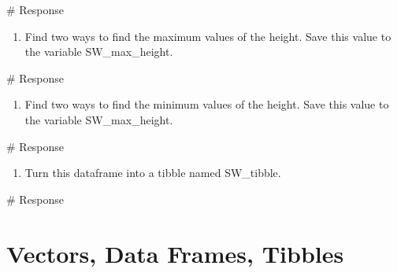 \documentclass[
  letterpaper,
  DIV=11,
  numbers=noendperiod]{scrreprt}
\newenvironment{Shaded}{\begin{snugshade}}{\end{snugshade}}
\newcommand{\CommentTok}[1]{\textcolor[rgb]{0.37,0.37,0.37}{#1}}
\providecommand{\tightlist}{%
  \setlength{\itemsep}{0pt}\setlength{\parskip}{0pt}}\usepackage{longtable,booktabs,array}
\begin{document}
\begin{Shaded}
\begin{Highlighting}[]
\CommentTok{\# Response}
\end{Highlighting}
\end{Shaded}

\begin{enumerate}
\def\labelenumi{\arabic{enumi}.}
\setcounter{enumi}{8}
\tightlist
\item
  Find two ways to find the maximum values of the height. Save this
  value to the variable SW\_max\_height.
\end{enumerate}

\begin{Shaded}
\begin{Highlighting}[]
\CommentTok{\# Response}
\end{Highlighting}
\end{Shaded}

\begin{enumerate}
\def\labelenumi{\arabic{enumi}.}
\setcounter{enumi}{9}
\tightlist
\item
  Find two ways to find the minimum values of the height. Save this
  value to the variable SW\_max\_height.
\end{enumerate}

\begin{Shaded}
\begin{Highlighting}[]
\CommentTok{\# Response}
\end{Highlighting}
\end{Shaded}

\begin{enumerate}
\def\labelenumi{\arabic{enumi}.}
\setcounter{enumi}{10}
\tightlist
\item
  Turn this dataframe into a tibble named SW\_tibble.
\end{enumerate}

\begin{Shaded}
\begin{Highlighting}[]
\CommentTok{\# Response}
\end{Highlighting}
\end{Shaded}


\chapter*{Vectors, Data Frames,
Tibbles}\label{vectors-data-frames-tibbles}
\end{document}
